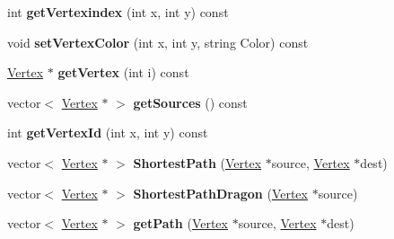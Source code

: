 \begin{DoxyCompactItemize}
\item 
\hypertarget{class_graph_a9793b4f564d1299978495e8cf60f1819}{int {\bfseries get\-Vertexindex} (int x, int y) const }\label{class_graph_a9793b4f564d1299978495e8cf60f1819}

\item 
\hypertarget{class_graph_a828e8c09c9a03c05c79cb662f569ac40}{void {\bfseries set\-Vertex\-Color} (int x, int y, string Color) const }\label{class_graph_a828e8c09c9a03c05c79cb662f569ac40}

\item 
\hypertarget{class_graph_a6a203671edfb18e3e2cb0f7ec1f7b94e}{\hyperlink{class_vertex}{Vertex} $\ast$ {\bfseries get\-Vertex} (int i) const }\label{class_graph_a6a203671edfb18e3e2cb0f7ec1f7b94e}

\item 
\hypertarget{class_graph_ac1ee8cd3b632d6e3fafa5b06bf114ace}{vector$<$ \hyperlink{class_vertex}{Vertex} $\ast$ $>$ {\bfseries get\-Sources} () const }\label{class_graph_ac1ee8cd3b632d6e3fafa5b06bf114ace}

\item 
\hypertarget{class_graph_a8e6e291219a8bcf6317535d51e51de3e}{int {\bfseries get\-Vertex\-Id} (int x, int y) const }\label{class_graph_a8e6e291219a8bcf6317535d51e51de3e}

\item 
\hypertarget{class_graph_a2b5e91399101a54f66fa97a6deb8b646}{vector$<$ \hyperlink{class_vertex}{Vertex} $\ast$ $>$ {\bfseries Shortest\-Path} (\hyperlink{class_vertex}{Vertex} $\ast$source, \hyperlink{class_vertex}{Vertex} $\ast$dest)}\label{class_graph_a2b5e91399101a54f66fa97a6deb8b646}

\item 
\hypertarget{class_graph_aa9ea45f6677b8fc9b1db67235a827d2e}{vector$<$ \hyperlink{class_vertex}{Vertex} $\ast$ $>$ {\bfseries Shortest\-Path\-Dragon} (\hyperlink{class_vertex}{Vertex} $\ast$source)}\label{class_graph_aa9ea45f6677b8fc9b1db67235a827d2e}

\item 
\hypertarget{class_graph_a67d3a467d2e65a3aa72462509fcd7a25}{vector$<$ \hyperlink{class_vertex}{Vertex} $\ast$ $>$ {\bfseries get\-Path} (\hyperlink{class_vertex}{Vertex} $\ast$source, \hyperlink{class_vertex}{Vertex} $\ast$dest)}\label{class_graph_a67d3a467d2e65a3aa72462509fcd7a25}

\end{DoxyCompactItemize}
